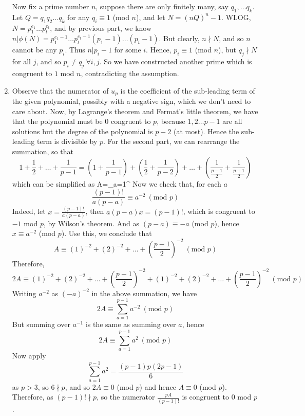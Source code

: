 \begin{enumerate}
    Now fix a prime number $n$, suppose there are only finitely many, say $q_1, \ldots q_k$. Let $Q=q_1 q_2 \ldots q_k$ for any $q_i \equiv 1$ (mod $n$), and let $N=(nQ)^n-1$. WLOG, $N=p_1^{e_1}\ldots p_t^{e_t}$, and by previous part, we know $n|\phi(N)=p_1^{e_1-1} \ldots p_t^{e_t-1}(p_1-1)\ldots(p_t-1)$. But clearly, $n \nmid N$, and so $n$ cannot be any $p_i$. Thus $n|p_i-1$ for some $i$. Hence, $p_i \equiv 1$ (mod $n$), but $q_j \nmid N$ for all $j$, and so $p_i \neq q_j ~\forall i,j$. So we have constructed another prime which is congruent to $1$ mod $n$, contradicting the assumption.
\item Observe that the numerator of $u_p$ is the coefficient of the sub-leading term of the given polynomial, possibly with a negative sign, which we don't need to care about. Now, by Lagrange's theorem and Fermat's little theorem, we have that the polynomial must be $0$ congruent to $p$, because $1,2 \ldots p-1$ are all solutions but the degree of the polynomial is $p-2$ (at most). Hence the sub-leading term is divisible by $p$.
    For the second part, we can rearrange the summation, so that
    $$1+\frac{1}{2}+\ldots+\frac{1}{p-1}=(1+\frac{1}{p-1})+(\frac{1}{2}+\frac{1}{p-2})
    +\ldots+(\frac{1}{\frac{p-1}{2}}+\frac{1}{\frac{p+1}{2}})$$
    which can be simplified as
    \be
{}\quad {}A=\sum_{a=1}^{} 
\ee
    Now we check that, for each $a$
    $$\frac{(p-1)!}{a(p-a)} \equiv a^{-2}~(\text{mod } p)$$
    Indeed, let $x=\frac{(p-1)!}{a(p-a)}$, then $a(p-a)x=(p-1)!$, which is congruent to $-1$ mod $p$, by Wilson's theorem. And as $(p-a) \equiv -a$ (mod $p$), hence $x \equiv a^{-2}$ (mod $p$).
    Use this, we conclude that
    $$A \equiv (1)^{-2}+(2)^{-2}+\ldots + (\frac{p-1}{2})^{-2}~(\text{mod } p)$$
    Therefore,
    $$2A \equiv (1)^{-2}+(2)^{-2}+\ldots + (\frac{p-1}{2})^{-2}+(1)^{-2}+(2)^{-2}+\ldots + (\frac{p-1}{2})^{-2}~(\text{mod } p)$$
    Writing $a^{-2}$ as $(-a)^{-2}$ in the above summation, we have
    $$2A \equiv \sum_{a=1}^{p-1} a^{-2}~(\text{mod } p)$$
    But summing over $a^{-1}$ is the same as summing over $a$, hence
    $$2A \equiv \sum_{a=1}^{p-1} a^2~(\text{mod } p)$$
    Now apply
    $$\sum_{a=1}^{p-1}a^2=\frac{(p-1)p(2p-1)}{6}$$
    as $p>3$, so $6 \nmid p$, and so $2A \equiv 0$ (mod $p$) and hence $A \equiv 0$ (mod $p$).
    Therefore, as $(p-1)! \nmid p$, so the numerator $\frac{pA}{(p-1)!}$ is congruent to $0$ mod $p$.
\end{enumerate}


